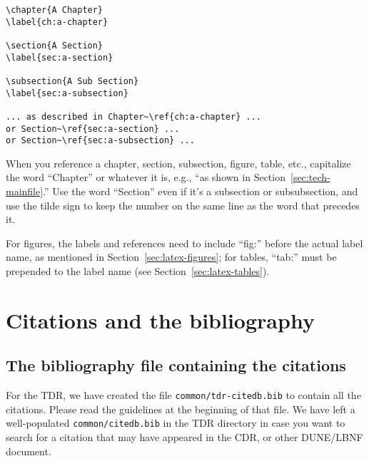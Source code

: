 \begin{verbatim}
\chapter{A Chapter}
\label{ch:a-chapter}

\section{A Section}
\label{sec:a-section}

\subsection{A Sub Section}
\label{sec:a-subsection}

... as described in Chapter~\ref{ch:a-chapter} ... 
or Section~\ref{sec:a-section} ... 
or Section~\ref{sec:a-subsection} ...

\end{verbatim}

When you reference a chapter, section, subsection, figure, table,
etc., capitalize the word ``Chapter'' or whatever it is, e.g., ``as
shown in Section~\ref{sec:tech-mainfile}.''
Use the word ``Section'' even if it's a subsection or subsubsection,
and use the tilde sign to keep the number on the same line as the word
that precedes it.

For figures, the labels and references need to include ``fig:'' before the actual label name, as mentioned in Section~\ref{sec:latex-figures}; for tables, ``tab:'' must be prepended to the label name (see Section~\ref{sec:latex-tables}).


\section{Citations and the bibliography}
\label{sec:latex-cit}

\subsection{The bibliography file containing the citations}
\label{sec:latex-bib-file}

For the TDR, we have created the file \texttt{common/tdr-citedb.bib} to contain all the citations. Please read the guidelines at the
beginning of that file. We have left a well-populated \texttt{common/citedb.bib} in the TDR directory in case you want to search for a citation
 that may have appeared in the CDR, or other DUNE/LBNF document.

